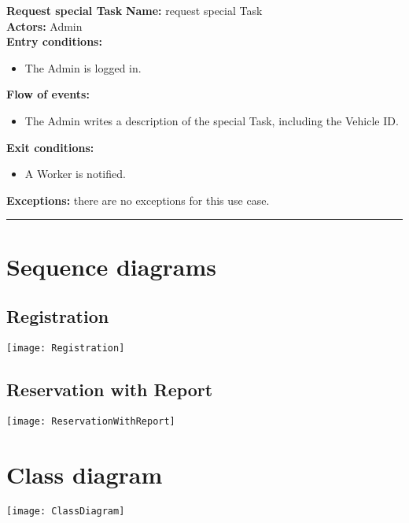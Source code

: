 \textbf{\large Request special Task}
\bigbreak
\textbf{Name:} request special Task \\
\textbf{Actors:} Admin \\
\textbf{Entry conditions:} 
\begin{itemize}
\item The Admin is logged in.
\end{itemize}
\textbf{Flow of events:} 
\begin{itemize}
\item The Admin writes a description of the special Task, including the Vehicle ID.
\end{itemize}
\textbf{Exit conditions:} 
\begin{itemize}
\item A Worker is notified.
\end{itemize}
\textbf{Exceptions:} there are no exceptions for this use case.\\


\begin{center}
\noindent\rule{8cm}{1.0pt}
\end{center}


\section{Sequence diagrams}
\subsection{Registration}
\begin{center}
\texttt{[image: Registration]}
\end{center}
\subsection{Reservation with Report}
\begin{center}
\texttt{[image: ReservationWithReport]}
\end{center}

\newpage
\section{Class diagram}
\begin{center}
\texttt{[image: ClassDiagram]}
\end{center}

